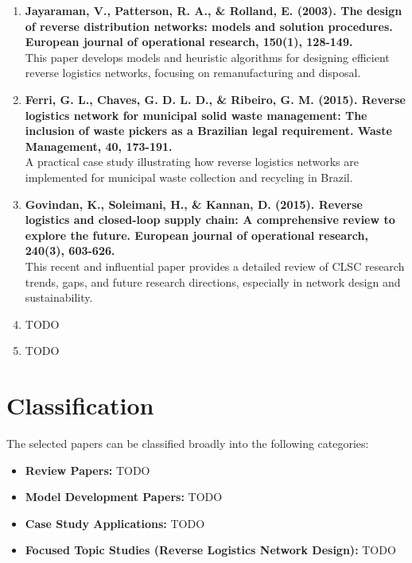 \documentclass[12pt]{article}
\begin{document}
\begin{enumerate}
    \item \textbf{Jayaraman, V., Patterson, R. A., \& Rolland, E. (2003). The design of reverse distribution networks: models and solution procedures. European journal of operational research, 150(1), 128-149.} \\[0.5em]
    {\small This paper develops models and heuristic algorithms for designing efficient reverse logistics networks, focusing on remanufacturing and disposal.}

    \item \textbf{Ferri, G. L., Chaves, G. D. L. D., \& Ribeiro, G. M. (2015). Reverse logistics network for municipal solid waste management: The inclusion of waste pickers as a Brazilian legal requirement. Waste Management, 40, 173-191.} \\[0.5em]
    {\small A practical case study illustrating how reverse logistics networks are implemented for municipal waste collection and recycling in Brazil.}

    \item \textbf{Govindan, K., Soleimani, H., \& Kannan, D. (2015). Reverse logistics and closed-loop supply chain: A comprehensive review to explore the future. European journal of operational research, 240(3), 603-626.} \\[0.5em]
    {\small This recent and influential paper provides a detailed review of CLSC research trends, gaps, and future research directions, especially in network design and sustainability.}

    \item TODO
    
    \item TODO
\end{enumerate}

\section*{Classification}

The selected papers can be classified broadly into the following categories:

\begin{itemize}
    \item \textbf{Review Papers:} TODO
    \item \textbf{Model Development Papers:} TODO
    \item \textbf{Case Study Applications:} TODO
    \item \textbf{Focused Topic Studies (Reverse Logistics Network Design):} TODO
\end{itemize}
\end{document}
